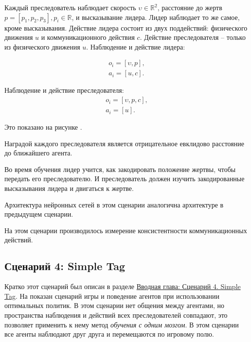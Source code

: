 Каждый преследователь наблюдает скорость $\upsilon \in \mathbb{R}^2$, расстояние до жертв $p = [p_1, p_2, p_3], p_i \in \mathbb{R}$, и высказывание лидера. Лидер наблюдает то же самое, кроме высказывания. Действие лидера состоит из двух поддействий: физического движения $u$ и коммуникационного действия $c$. Действие преследователя – только из физического движения $u$.
Наблюдение и действие лидера:

\begin{equation}
    \begin{multlined}
        o_i = [\upsilon, p], \\
        a_i = [u, c].
    \end{multlined}
\end{equation}

Наблюдение и действие преследователя:
\begin{equation}
    \begin{multlined}
        o_i = [\upsilon, p, c], \\
        a_i = [u].
    \end{multlined}
\end{equation}

Это показано на рисунке .

Наградой каждого преследователя является отрицательное евклидово расстояние до ближайшего агента.

Во время обучения лидер учится, как закодировать положение жертвы, чтобы передать его преследователю. И преследователь должен изучить закодированные высказывания лидера и двигаться к жертве.

Архитектура нейронных сетей в этом сценарии аналогична архитектуре в предыдущем сценарии.

На этом сценарии производилось измерение консистентности коммуникационных действий.

\subsection{Сценарий 4: Simple Tag} \label{exp-st}

Кратко этот сценарий был описан в разделе \hyperref[intro-st]{Вводная глава: Сценарий 4. Simple Tag}. На  показан сценарий игры и поведение агентов при использовании оптимальных политик. В этом сценарии нет общения между агентами, но пространства наблюдения и действий всех преследователей совпадают, это позволяет применить к нему метод \textit{обучения с одним мозгом}. В этом сценарии все агенты наблюдают друг друга и перемещаются по игровому полю.

